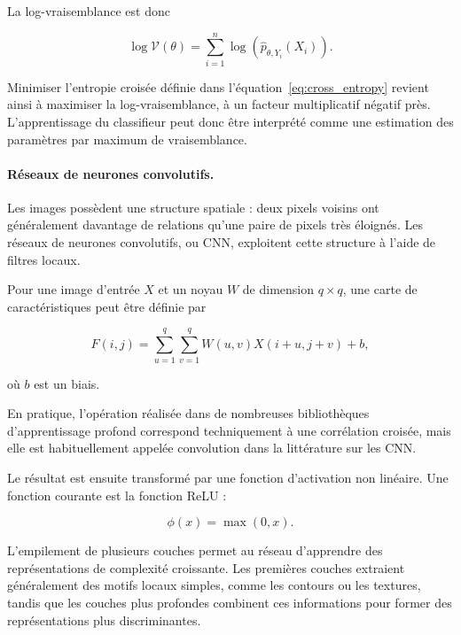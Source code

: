 \documentclass[11pt,a4paper]{report}
\begin{document}
La log-vraisemblance est donc

\begin{equation}
    \log \mathcal{V}(\theta)
    =
    \sum_{i=1}^{n}
    \log
    \left(
        \widehat{p}_{\theta,Y_i}(X_i)
    \right).
\end{equation}

Minimiser l'entropie croisée définie dans
l'équation~\eqref{eq:cross_entropy} revient ainsi à maximiser la
log-vraisemblance, à un facteur multiplicatif négatif près. L'apprentissage
du classifieur peut donc être interprété comme une estimation des paramètres
par maximum de vraisemblance.

\paragraph{Réseaux de neurones convolutifs.}

Les images possèdent une structure spatiale : deux pixels voisins ont
généralement davantage de relations qu'une paire de pixels très éloignés.
Les réseaux de neurones convolutifs, ou CNN, exploitent cette structure à
l'aide de filtres locaux.

Pour une image d'entrée $X$ et un noyau $W$ de dimension $q \times q$, une
carte de caractéristiques peut être définie par

\begin{equation}
    F(i,j)
    =
    \sum_{u=1}^{q}
    \sum_{v=1}^{q}
    W(u,v)X(i+u,j+v)+b,
    \label{eq:convolution}
\end{equation}

où $b$ est un biais.

En pratique, l'opération réalisée dans de nombreuses bibliothèques
d'apprentissage profond correspond techniquement à une corrélation croisée,
mais elle est habituellement appelée convolution dans la littérature sur les
CNN.

Le résultat est ensuite transformé par une fonction d'activation non linéaire.
Une fonction courante est la fonction ReLU :

\begin{equation}
    \phi(x)=\max(0,x).
\end{equation}

L'empilement de plusieurs couches permet au réseau d'apprendre des
représentations de complexité croissante. Les premières couches extraient
généralement des motifs locaux simples, comme les contours ou les textures,
tandis que les couches plus profondes combinent ces informations pour former
des représentations plus discriminantes.
\end{document}
